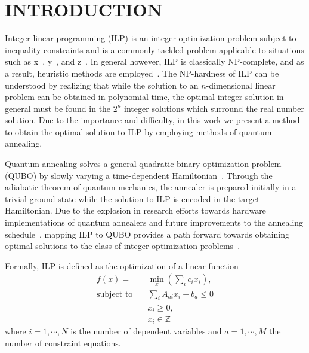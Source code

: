 \documentclass[prd,twocolumn,tightenlines,preprintnumbers,showpacs,superscriptaddress,notitlepage,nofootinbib,eqsecnum,floatfix,longbibliography]{revtex4}
\begin{document}

\maketitle
\tableofcontents

\flushbottom
\maketitle

\section{INTRODUCTION}
\label{sec:introduction}

Integer linear programming (ILP) is an integer optimization problem subject to inequality constraints and is a commonly tackled problem applicable to situations such as x~\cite{}, y~\cite{}, and z~\cite{}.
In general however, ILP is classically NP-complete, and as a result, heuristic methods are employed~\cite{}.
The NP-hardness of ILP can be understood by realizing that while the solution to an $n$-dimensional linear problem can be obtained in polynomial time, the optimal integer solution in general must be found in the $2^n$ integer solutions which surround the real number solution.
Due to the importance and difficulty, in this work we present a method to obtain the optimal solution to ILP by employing methods of quantum annealing.

Quantum annealing solves a general quadratic binary optimization problem (QUBO) by slowly varying a time-dependent Hamiltonian~\cite{}.
Through the adiabatic theorem of quantum mechanics, the annealer is prepared initially in a trivial ground state while the solution to ILP is encoded in the target Hamiltonian.
Due to the explosion in research efforts towards hardware implementations of quantum annealers and future improvements to the annealing schedule~\cite{}, mapping ILP to QUBO provides a path forward towards obtaining optimal solutions to the class of integer optimization problems~\cite{2018Glover}.

Formally, ILP is defined as the optimization of a linear function
{\color{blue}
\begin{align}
    f(x) = &\min\limits_{x}(\sum_i c_i x_i),\\
    \textrm{subject to} \quad & \sum_i A_{ai}x_i +b_a \leq 0 \\
    & x_i \geq 0,\\
    & x_i \in \mathbb{Z}
\end{align}
}
where $i=1, \cdots,  N$ is the number of dependent variables and $a=1, \cdots, M$ the number of constraint equations.
\end{document}
